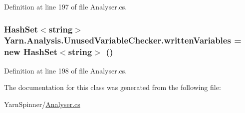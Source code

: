 Definition at line 197 of file Analyser.\-cs.

\hypertarget{a00187_a0c2fe6eded1b10b135ca2469f5980a39}{
\subsubsection[{written\-Variables}]{\setlength{\rightskip}{0pt plus 5cm}Hash\-Set$<$string$>$ Yarn.\-Analysis.\-Unused\-Variable\-Checker.\-written\-Variables = new Hash\-Set$<$string$>$ ()\hspace{0.3cm}{\ttfamily [private]}}}\label{a00187_a0c2fe6eded1b10b135ca2469f5980a39}


Definition at line 198 of file Analyser.\-cs.



The documentation for this class was generated from the following file\-:\begin{DoxyCompactItemize}
\item 
Yarn\-Spinner/\hyperlink{a00305}{Analyser.\-cs}\end{DoxyCompactItemize}
